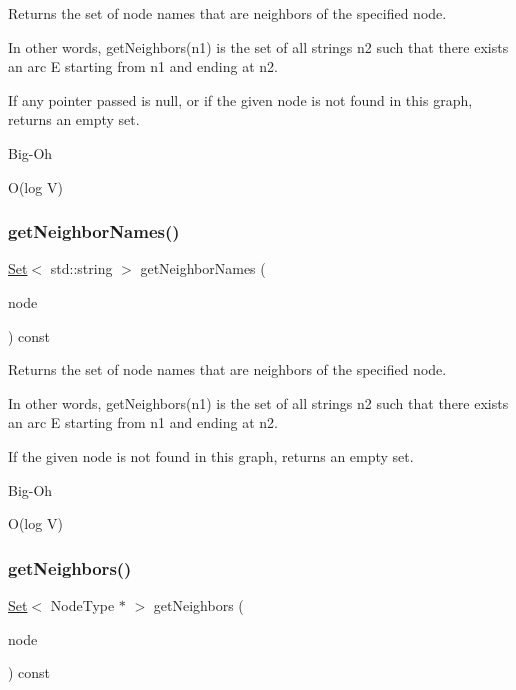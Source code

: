 Returns the set of node names that are neighbors of the specified node. 

In other words, get\+Neighbors(n1) is the set of all strings n2 such that there exists an arc E starting from n1 and ending at n2.

If any pointer passed is null, or if the given node is not found in this graph, returns an empty set. \begin{DoxyRefDesc}{Big-\/\+Oh}
\item[\mbox{\hyperlink{BigOh__BigOh000071}{Big-\/\+Oh}}]O(log V) \end{DoxyRefDesc}
\mbox{\label{classGraph_a6175b4d672266465dd34e070c7710b34}} 
\subsubsection{\texorpdfstring{get\+Neighbor\+Names()}{getNeighborNames()}\hspace{0.1cm}{\footnotesize\ttfamily [2/2]}}
{\footnotesize\ttfamily \mbox{\hyperlink{classSet}{Set}}$<$ std\+::string $>$ get\+Neighbor\+Names (\begin{DoxyParamCaption}\item[{const std\+::string \&}]{node }\end{DoxyParamCaption}) const}



Returns the set of node names that are neighbors of the specified node. 

In other words, get\+Neighbors(n1) is the set of all strings n2 such that there exists an arc E starting from n1 and ending at n2.

If the given node is not found in this graph, returns an empty set. \begin{DoxyRefDesc}{Big-\/\+Oh}
\item[\mbox{\hyperlink{BigOh__BigOh000072}{Big-\/\+Oh}}]O(log V) \end{DoxyRefDesc}
\mbox{\label{classGraph_a0e49b167f0623a8ae76040c3e5eab3fb}} 
\subsubsection{\texorpdfstring{get\+Neighbors()}{getNeighbors()}\hspace{0.1cm}{\footnotesize\ttfamily [1/2]}}
{\footnotesize\ttfamily \mbox{\hyperlink{classSet}{Set}}$<$ Node\+Type $\ast$ $>$ get\+Neighbors (\begin{DoxyParamCaption}\item[{Node\+Type $\ast$}]{node }\end{DoxyParamCaption}) const}




